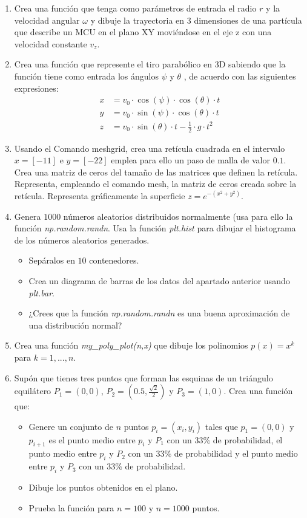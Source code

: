 \begin{enumerate}
\item Crea una función que tenga como parámetros de entrada el radio $r$ y
la velocidad angular $\omega$ y dibuje la trayectoria en 3 dimensiones de una partícula que describe un MCU en el plano XY moviéndose en el eje z con una velocidad constante $v_z$.

\item Crea una función que represente el tiro parabólico en 3D sabiendo
que la función tiene como entrada los ángulos $\psi$ y $\theta$ , de acuerdo con las siguientes expresiones:
\begin{align*}
    x&=v_0 \cdot \cos(\psi)\cdot \cos(\theta) \cdot t \\
    y&=v_0 \cdot \sin(\psi)\cdot \cos(\theta) \cdot t  \\
    z&=v_0 \cdot \sin(\theta) \cdot t- \frac{1}{2} \cdot g \cdot t^2
\end{align*}

\item Usando el Comando meshgrid, crea una retícula cuadrada en el intervalo $x = [-1 1]$ e  $y = [-2 2]$ emplea para ello un paso de malla de valor $0.1$. Crea una matriz de ceros del tamaño de las matrices que definen la retícula. Representa, empleando el comando mesh, la matriz de ceros
creada sobre la retícula. Representa gráficamente la superficie $z = e^{-(x^2+y^2)}$. 

\item Genera $1000$ números aleatorios distribuidos normalmente (usa para ello la función \emph{np.random.randn}. Usa la función \emph{plt.hist} para dibujar el histograma de los números aleatorios generados. 
\begin{itemize}
    \item Sepáralos en $10$ contenedores.
    \item Crea un diagrama de barras de los datos del apartado anterior usando  \emph{plt.bar}.
    \item ¿Crees que la función \emph{np.random.randn} es una buena aproximación de una distribución normal?
\end{itemize}

\item  Crea una función \emph{my\_poly\_plot(n,x)} que dibuje los polinomios $p(x)=x^k$ para $k=1,...,n$.

\item Supón que tienes tres puntos que forman las esquinas de un triángulo equilátero $P_1=(0,0)$, $P_2=(0.5,\frac{\sqrt{2}}{2})$ y $P_3=(1,0)$. Crea una función que:
\begin{itemize}
    \item Genere un conjunto de $n$ puntos $p_i=(x_i,y_i)$ tales que $p_1=(0,0)$ y $p_{i+1}$  es el punto medio entre $p_i$ y $P_1$ con un $33\%$ de probabilidad, el punto medio entre  $p_i$ y $P_2$ con un $33\%$ de probabilidad y  el punto medio entre $p_i$ y $P_3$ con un $33\%$ de probabilidad.
    \item Dibuje los puntos obtenidos en el plano.
    \item Prueba la función para $n=100$ y  $n=1000$ puntos.
\end{itemize}

\end{enumerate}
